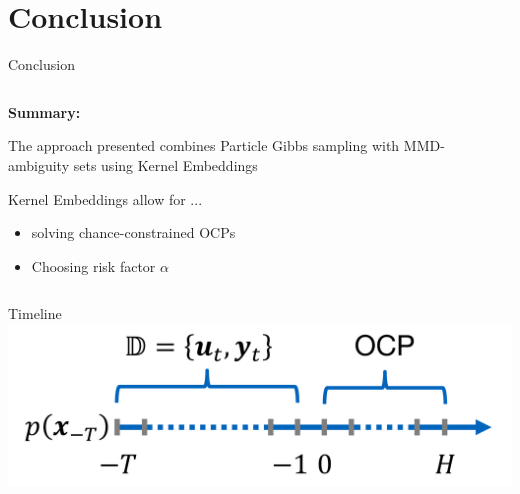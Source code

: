 \documentclass[student, noshadow, itr, english, aspectratio=169]{ITR_LSR_slides}
\begin{document}
\section{Conclusion}

\begin{frame}{Conclusion}
	\begin{columns}[onlytextwidth, T]
		\begin{column}{.5\textwidth}
			\textbf{Summary:}
		
			The approach presented combines Particle Gibbs sampling with MMD-ambiguity sets using Kernel Embeddings
		
			\vspace{.5cm}
		
			Kernel Embeddings allow for ...
			\begin{itemize}
				\item solving chance-constrained OCPs
				\item Choosing risk factor $\alpha$
			\end{itemize}
		\end{column}
		\begin{column}{.5\textwidth}
			
		\end{column}
	\end{columns}
\end{frame}

	\appendix


\begin{frame}{\LSRITRRefTitle}
	\printbibliography
\end{frame}

\begin{frame}{Timeline}
\includegraphics[width= .9\textwidth]{Timeline_pic}
\end{frame}
\end{document}
